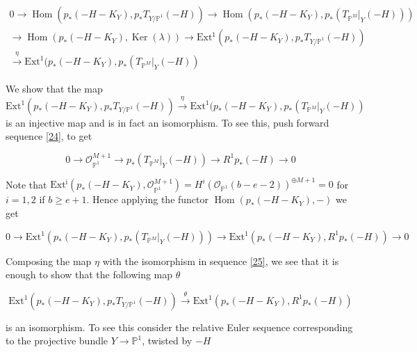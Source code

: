 \documentclass[11pt,twoside]{amsart}
\theoremstyle{plain}
\numberwithin{equation}{section}
\theoremstyle{definition}
\begin{document}
\begin{multline}\label{30}
0 \to \operatorname{Hom}(p_*(-H-K_Y), 
 p_*T_{Y/\mathbb{P}^1}(-H))  \to \operatorname{Hom}(p_*(-H-K_Y), p_*(T_{\mathbb{P}^M}|_Y(-H))) \\ \to \operatorname{Hom}(p_*(-H-K_Y),\operatorname{Ker}(\lambda)) \to \operatorname{Ext^1}(p_*(-H-K_Y), 
 p_*T_{Y/\mathbb{P}^1}(-H)) \\ \xrightarrow[]{\eta} \operatorname{Ext^1}(p_*(-H-K_Y), 
 p_*(T_{\mathbb{P}^M}|_Y(-H))
\end{multline}


We show that the map $\operatorname{Ext^1}(p_*(-H-K_Y), 
 p_*T_{Y/\mathbb{P}^1}(-H))  \xrightarrow[]{\eta} \operatorname{Ext^1}(p_*(-H-K_Y), 
 p_*(T_{\mathbb{P}^M}|_Y(-H))$ is an injective map and is in fact an isomorphism. To see this, push forward sequence \ref{24}, to get 

 \begin{equation}\label{25}
     0 \to \mathcal{O}_{\mathbb{P}^1}^{M+1} \to p_*(T_{\mathbb{P}^M}|_Y(-H)) \to R^1p_*(-H) \to 0
 \end{equation}

Note that $\operatorname{Ext^i}(p_*(-H-K_Y), \mathcal{O}_{\mathbb{P}^1}^{M+1}) = H^i(\mathcal{O}_{\mathbb{P}^1}(b-e-2))^{\oplus M+1} = 0$ for $i = 1,2$ if $b \geq e+1$. Hence applying the functor $\operatorname{Hom}(p_*(-H-K_Y), -)$ we get 

\begin{equation}\label{26}
     0 \to \operatorname{Ext^1}(p_*(-H-K_Y), 
 p_*(T_{\mathbb{P}^M}|_Y(-H))) \to \operatorname{Ext^1}(p_*(-H-K_Y), 
 R^1p_*(-H)) \to 0
 \end{equation}

Composing the map $\eta$ with the isomorphism in sequence \ref{25}, we see that it is enough to show that the following map $\theta$ 

\begin{equation}\label{27}
   \operatorname{Ext^1}(p_*(-H-K_Y), 
 p_*T_{Y/\mathbb{P}^1}(-H))  \xrightarrow[]{\theta} \operatorname{Ext^1}(p_*(-H-K_Y), 
 R^1p_*(-H)) 
\end{equation}

is an isomorphism. To see this consider the relative Euler sequence corresponding to the projective bundle $Y \to \mathbb{P}^1$, twisted by $-H$ 
\end{document}
